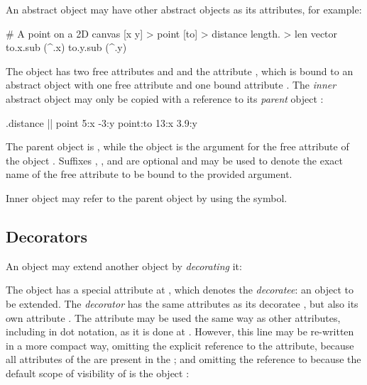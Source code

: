 An abstract object may have other abstract objects as its attributes,
for example:

\begin{ffcode}
# A point on a 2D canvas
[x y] > point
  [to] > distance
    length. > len
      vector
        to.x.sub (^.x)
        to.y.sub (^.y)
\end{ffcode}

The object  has two free attributes  and 
and the attribute , which is bound to an abstract
object with one free attribute  and one bound attribute .
The \emph{inner} abstract object  may only be copied
with a reference to its \emph{parent} object :

\begin{ffcode}
.distance |$\label{ln:point-copy}$|
  point
    5:x
    -3:y
  point:to
    13:x
    3.9:y
\end{ffcode}

The parent object is , while the object 
is the argument for the free attribute  of the object .
Suffixes , , and  are optional and may be used
to denote the exact name of the free attribute to be bound to the
provided argument.

Inner object may refer to the parent object by using the \ff{\^{}} symbol.

\subsection{Decorators}

An object may extend another object by \emph{decorating} it:


The object  has a special attribute 
at , which denotes
the \emph{decoratee}: an object to be extended. The \emph{decorator} 
has the same attributes as its decoratee , but also
its own attribute . The attribute  may be used
the same way as other attributes, including in dot notation, as it is done
at . However, this line
may be re-written in a more compact way, omitting the explicit
reference to the  attribute, because all attributes
of the  are present in the ;
and omitting the reference to \ff{\$} because the default scope of visibility of
 is the object :

